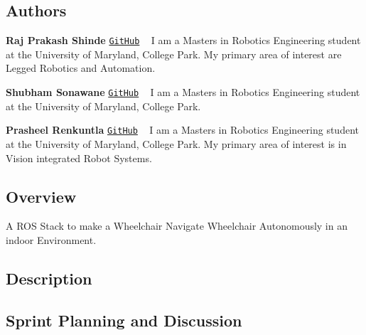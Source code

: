 

\href{https://travis-ci.org/RajPShinde/Autonomous_Wheelchair}{\tt } \href{https://coveralls.io/github/RajPShinde/Autonomous_Wheelchair?branch=master&service=github}{\tt } \href{https://github.com/RajPShinde/Autonomous_Wheelchair/blob/master/LICENSE}{\tt } \subsection*{\href{https://github.com/RajPShinde/Autonomous_Wheelchair/docs}{\tt } }

\subsection*{Authors}


\begin{DoxyItemize}
\item {\bfseries Raj Prakash Shinde} \href{https://github.com/RajPShinde}{\tt Git\+Hub} ~\newline
I am a Masters in Robotics Engineering student at the University of Maryland, College Park. My primary area of interest are Legged Robotics and Automation.
\item {\bfseries Shubham Sonawane} \href{https://github.com/shubham1925}{\tt Git\+Hub} ~\newline
I am a Master\textquotesingle{}s in Robotics Engineering student at the University of Maryland, College Park.
\item {\bfseries Prasheel Renkuntla} \href{https://github.com/Prasheel24}{\tt Git\+Hub} ~\newline
I am a Master\textquotesingle{}s in Robotics Engineering student at the University of Maryland, College Park. My primary area of interest is in Vision integrated Robot Systems.
\end{DoxyItemize}

\subsection*{Overview}

A R\+OS Stack to make a Wheelchair Navigate Wheelchair Autonomously in an indoor Environment.

\subsection*{Description}

\subsection*{Sprint Planning and Discussion}

